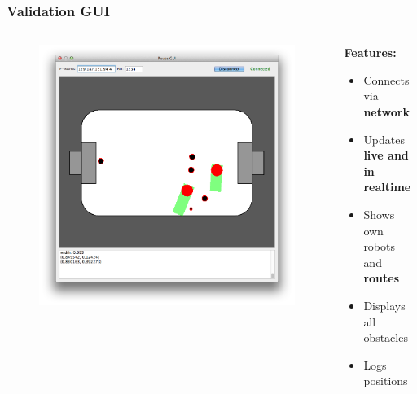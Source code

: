 \documentclass[hyperref={pdfpagelabels=false},compress]{beamer}
\begin{document}
\begin{frame}
    \frametitle{Validation GUI}
    \begin{columns}[T]
        \begin{column}{0.4\textwidth}
            \begin{figure}
                \center
                \includegraphics[width=\textwidth]{Pictures/gui-small}
            \end{figure}
        \end{column}
        \begin{column}{0.6\textwidth}
            \textbf{Features:}
            \begin{itemize}
                \item Connects via \textbf{network}
                \item Updates \textbf{live and in realtime}
                \item Shows own robots and \textbf{routes}
                \item Displays all obstacles
                \item Logs positions
            \end{itemize}
        \end{column}
    \end{columns}
\end{frame}
\end{document}
